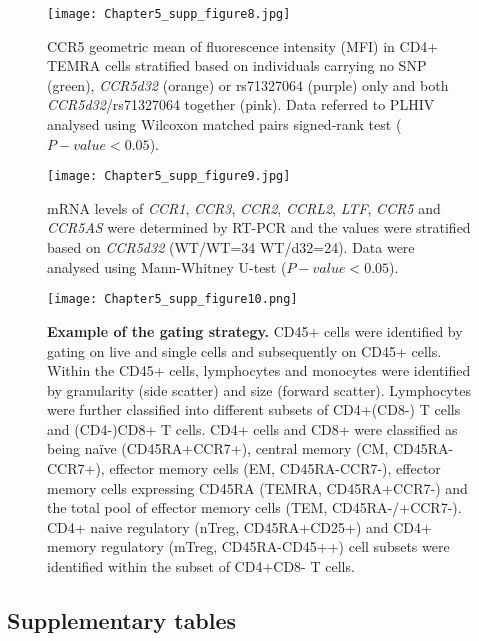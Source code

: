 \documentclass{book}
\begin{document}
\begin{refsection}
\begin{figure}[H] %
  \centering
  \texttt{[image: Chapter5\_supp\_figure8.jpg]}
  \caption{\label{fig:chp5supfig8}
    CCR5 geometric mean of fluorescence intensity (MFI) in CD4+ TEMRA cells stratified based on individuals carrying no SNP (green), \textit{CCR5d32} (orange) or rs71327064 (purple) only and both \textit{CCR5d32}/rs71327064 together (pink).
    Data referred to PLHIV analysed using Wilcoxon matched pairs signed-rank test ($P-value < 0.05$).
  }
\end{figure}

\begin{figure}[H] %
  \centering
  \texttt{[image: Chapter5\_supp\_figure9.jpg]}
  \caption{\label{fig:chp5supfig9} \textbf{}
    mRNA levels of \textit{CCR1}, \textit{CCR3}, \textit{CCR2}, \textit{CCRL2}, \textit{LTF}, \textit{CCR5} and \textit{CCR5AS} were determined by RT-PCR and the values were stratified based on \textit{CCR5d32} (WT/WT=34 WT/d32=24).
    Data were analysed using Mann-Whitney U-test ($P-value < 0.05$).
  }
\end{figure}

\begin{figure}[H] %
  \centering
  \texttt{[image: Chapter5\_supp\_figure10.png]}
  \caption{\label{fig:chp5supfig10} \textbf{Example of the gating strategy.}
    CD45+ cells were identified by gating on live and single cells and subsequently on CD45+ cells.
    Within the CD45+ cells, lymphocytes and monocytes were identified by granularity (side scatter) and size (forward scatter).
    Lymphocytes were further classified into different subsets of CD4+(CD8-) T cells and (CD4-)CD8+ T cells.
    CD4+ cells and CD8+ were classified as being naïve (CD45RA+CCR7+), central memory (CM, CD45RA-CCR7+), effector memory cells (EM, CD45RA-CCR7-), effector memory cells expressing CD45RA (TEMRA, CD45RA+CCR7-) and the total pool of effector memory cells (TEM, CD45RA-/+CCR7-).
    CD4+ naive regulatory (nTreg, CD45RA+CD25+) and CD4+ memory regulatory (mTreg, CD45RA-CD45++) cell subsets were identified within the subset of CD4+CD8- T cells.
  }
\end{figure}

\newpage
\subsection*{Supplementary tables}
\renewcommand{\thetable}{\textbf{Table S\arabic{chapter}.\arabic{table}}}
\setcounter{table}{0}


\end{refsection}
\end{document}
